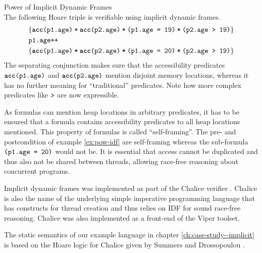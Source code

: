 \begin{example}{Power of Implicit Dynamic Frames}~\\
    \label{ex:pow-idf}
    The following Hoare triple is verifiable using implicit dynamic frames.
    \begin{alignat*}{1}
    &\{\textup{\texttt{\textup{\texttt{\textup{\texttt{\textbf{acc}(p1.age)}}\:*\:\textup{\texttt{\textbf{acc}(p2.age)}}}}\:*\:\textup{\texttt{\textup{\texttt{(p1.age = 19)}}\:*\:\textup{\texttt{(p2.age > 19)}}}}}}\}\\
    &{\textup{\texttt{p1.age++}}}\\
    &\{\textup{\texttt{\textup{\texttt{\textup{\texttt{\textbf{acc}(p1.age)}}\:*\:\textup{\texttt{\textbf{acc}(p2.age)}}}}\:*\:\textup{\texttt{\textup{\texttt{(p1.age = 20)}}\:*\:\textup{\texttt{(p2.age > 19)}}}}}}\}
    \end{alignat*}
    The separating conjunction makes sure that the accessibility predicates $\textup{\texttt{\textbf{acc}(p1.age)}}$ and $\textup{\texttt{\textbf{acc}(p2.age)}}$ mention disjoint memory locations, whereas it has no further meaning for “traditional” predicates.
    Note how more complex predicates like $\textup{\texttt{>}}$ are now expressible.
\end{example}

As formulas can mention heap locations in arbitrary predicates, it has to be ensured that a formula contains accessibility predicates to all heap locations mentioned.
This property of formulas is called “self-framing”.
The pre- and postcondition of example \ref{ex:pow-idf} are self-framing whereas the sub-formula $\textup{\texttt{(p1.age = 20)}}$ would not be.
It is essential that access cannot be duplicated and thus also not be shared between threads, allowing race-free reasoning about concurrent programs.

Implicit dynamic frames was implemented as part of the Chalice verifier \cite{leino2009verification}.
Chalice is also the name of the underlying simple imperative programming language that has constructs for thread creation and thus relies on IDF for sound race-free reasoning.
Chalice was also implemented as a front-end of the Viper toolset. %

The static semantics of our example language in chapter \ref{ch:case-study--implicit} is based on the Hoare logic for Chalice given by Summers and Drossopoulou \cite{summers2013formal}.


